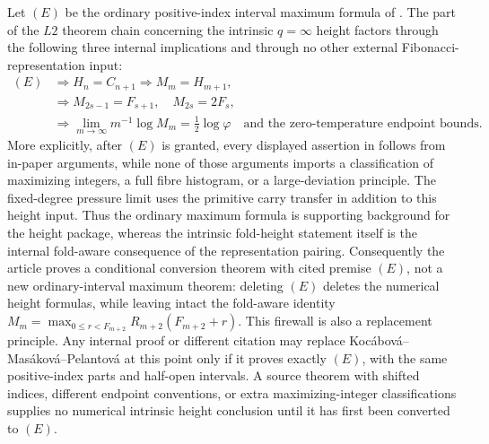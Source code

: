 \begin{theorem}
\label{thm:ordinary-maximum-supports-intrinsic-height}
\label{thm:intrinsic-height-dependency-firewall}
Let \((E)\) be the ordinary positive-index interval maximum formula of
.  The part of the \(L2\)
theorem chain concerning the intrinsic \(q=\infty\) height factors through the
following three internal implications and through no other external
Fibonacci-representation input:
\[
  \begin{aligned}
  (E)&\Longrightarrow H_n=C_{n+1}
      \Longrightarrow M_m=H_{m+1},\\
      &\Longrightarrow
      M_{2s-1}=F_{s+1},\quad M_{2s}=2F_s,\\
      &\Longrightarrow
      \lim_{m\to\infty}m^{-1}\log M_m=\frac12\log\varphi
      \quad\text{and the zero-temperature endpoint bounds.}
  \end{aligned}
\]
More explicitly, after \((E)\) is granted, every displayed assertion in
 follows from in-paper arguments,
while none of those arguments imports a classification of maximizing integers, a
full fibre histogram, or a large-deviation principle.  The fixed-degree pressure
limit uses the primitive carry transfer in addition to this height input.  Thus
the ordinary maximum formula is supporting background for the
height package, whereas the intrinsic fold-height statement itself is the
internal fold-aware consequence of the representation pairing.  Consequently the
article proves a conditional conversion theorem with cited premise \((E)\), not a
new ordinary-interval maximum theorem: deleting \((E)\) deletes the numerical
height formulas, while leaving intact the fold-aware identity
\(M_m=\max_{0\le r<F_{m+2}}R_{m+2}(F_{m+2}+r)\).
This firewall is also a replacement principle.  Any internal proof or different
citation may replace Koc\'abov\'a--Mas\'akov\'a--Pelantov\'a at this point only if
it proves exactly \((E)\), with the same positive-index parts and half-open
intervals.  A source theorem with shifted indices, different endpoint
conventions, or extra maximizing-integer classifications supplies no numerical
intrinsic height conclusion until it has first been converted to \((E)\).
\end{theorem}

